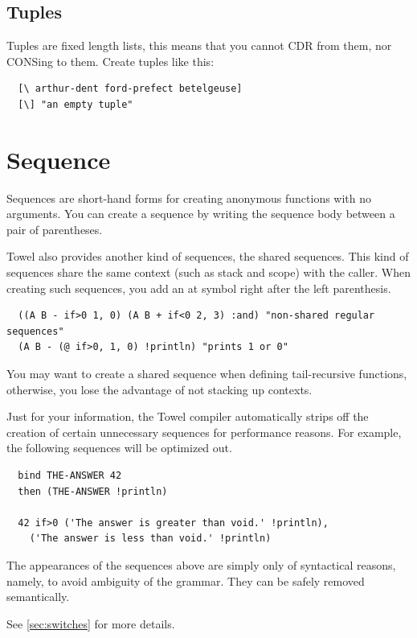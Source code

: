\documentclass{report}
\begin{document}
\subsection{Tuples}

Tuples are fixed length lists, this means that you cannot CDR from them, nor CONSing to them. Create tuples like this:
\begin{mdframed}[style=example]
\begin{verbatim}
  [\ arthur-dent ford-prefect betelgeuse]
  [\] "an empty tuple"
\end{verbatim}
\end{mdframed}

\section{Sequence}

Sequences are short-hand forms for creating anonymous functions with no arguments. You can create a sequence by writing the sequence body between a pair of parentheses.

Towel also provides another kind of sequences, the shared sequences. This kind of sequences share the same context (such as stack and scope) with the caller. When creating such sequences, you add an at symbol right after the left parenthesis.

\begin{mdframed}[style=example]
\begin{verbatim}
  ((A B - if>0 1, 0) (A B + if<0 2, 3) :and) "non-shared regular sequences"
  (A B - (@ if>0, 1, 0) !println) "prints 1 or 0"
\end{verbatim}
\end{mdframed}

You may want to create a shared sequence when defining tail-recursive functions, otherwise, you lose the advantage of not stacking up contexts.

\begin{mdframed}[style=hint]
Just for your information, the Towel compiler automatically strips off the creation of certain unnecessary sequences for performance reasons. For example, the following sequences will be optimized out.

\begin{verbatim}
  bind THE-ANSWER 42
  then (THE-ANSWER !println)

  42 if>0 ('The answer is greater than void.' !println),
    ('The answer is less than void.' !println)
\end{verbatim}

The appearances of the sequences above are simply only of syntactical reasons, namely, to avoid ambiguity of the grammar. They can be safely removed semantically.

See \autoref{sec:switches} for more details.
\end{mdframed}
\end{document}
